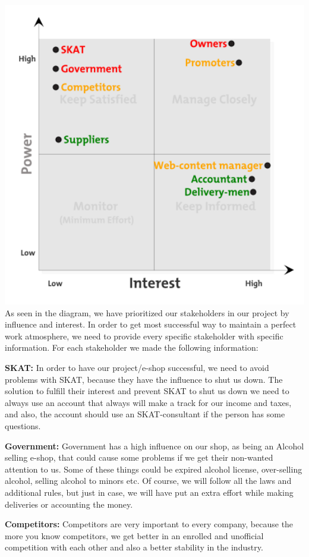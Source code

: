 \documentclass[12p]{article}
\begin{document}
\includegraphics[width=1\textwidth]{stakeholder}\\
As seen in the diagram, we have prioritized our stakeholders in our project by influence and interest. In order to get most successful way to maintain a perfect work atmosphere, we need to provide every specific stakeholder with specific information. For each stakeholder we made the following information: 

\textbf{SKAT:}
In order to have our project/e-shop successful, we need to avoid problems with SKAT, because they have the influence to shut us down. The solution to fulfill their interest and prevent SKAT to shut us down we need to always use an account that always will make a track for our income and taxes, and also, the account should use an SKAT-consultant if the person has some questions.

\textbf{Government:}
Government has a high influence on our shop, as being an Alcohol selling e-shop, that could cause some problems if we get their non-wanted attention to us. Some of these things could be expired alcohol license, over-selling alcohol, selling alcohol to minors etc. Of course, we will follow all the laws and additional rules, but just in case, we will have put an extra effort while making deliveries or accounting the money.

\textbf{Competitors:}
Competitors are very important to every company, because the more you know competitors, we get better in an enrolled and unofficial competition with each other and also a better stability in the industry.
\end{document}
